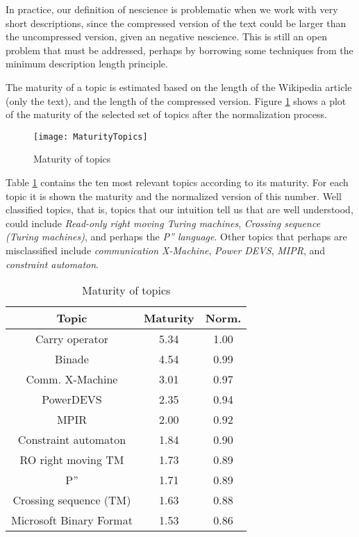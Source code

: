 In practice, our definition of nescience is problematic when we work
with very short descriptions, since the compressed version of the
text could be larger than the uncompressed version, given an negative
nescience. This is still an open problem that must be addressed, perhaps
by borrowing some techniques from the minimum description length principle.

The maturity of a topic is estimated based on the length of the Wikipedia
article (only the text), and the length of the compressed version.
Figure \ref{fig:Maturity-of-Topics} shows a plot of the maturity
of the selected set of topics after the normalization process.

\begin{figure}[h]
\centering\texttt{[image: MaturityTopics]}
\caption{\label{fig:Maturity-of-Topics}Maturity of topics}
\end{figure}

Table \ref{tab:Maturity-of-Topics} contains the ten most relevant
topics according to its maturity. For each topic it is shown the maturity
and the normalized version of this number. Well classified topics,
that is, topics that our intuition tell us that are well understood,
could include \emph{Read-only right moving Turing machines}, \emph{Crossing
sequence (Turing machines)}, and perhaps the \emph{P'' language}.
Other topics that perhaps are misclassified include \emph{communication
X-Machine}, \emph{Power DEVS}, \emph{MIPR}, and \emph{constraint automaton}.

\begin{table}
\begin{centering}
\begin{tabular}{|c|c|c|}
\hline 
Topic & Maturity & Norm.\tabularnewline
\hline 
\hline 
Carry operator & 5.34 & 1.00\tabularnewline
\hline 
Binade & 4.54 & 0.99\tabularnewline
\hline 
Comm. X-Machine & 3.01 & 0.97\tabularnewline
\hline 
PowerDEVS & 2.35 & 0.94\tabularnewline
\hline 
MPIR & 2.00 & 0.92\tabularnewline
\hline 
Constraint automaton & 1.84 & 0.90\tabularnewline
\hline 
RO right moving TM & 1.73 & 0.89\tabularnewline
\hline 
P'' & 1.71 & 0.89\tabularnewline
\hline 
Crossing sequence (TM) & 1.63 & 0.88\tabularnewline
\hline 
Microsoft Binary Format & 1.53 & 0.86\tabularnewline
\hline 
\end{tabular}
\par\end{centering}

\caption{\label{tab:Maturity-of-Topics}Maturity of topics}
\end{table}


